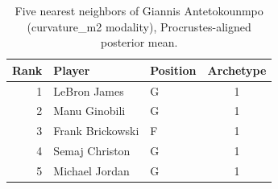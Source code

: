 \begin{table}[htbp]
  \centering\small
  \begin{tabular}{rllc}
    \toprule
    Rank & Player & Position & Archetype \\
    \midrule
    1 & LeBron James & G & 1 \\
    2 & Manu Ginobili & G & 1 \\
    3 & Frank Brickowski & F & 1 \\
    4 & Semaj Christon & G & 1 \\
    5 & Michael Jordan & G & 1 \\
    \bottomrule
  \end{tabular}
  \caption{Five nearest neighbors of Giannis Antetokounmpo (curvature_m2 modality), Procrustes-aligned posterior mean.}
  \label{tab:Giannis_Antetokounmpo_neighbors_curvature_m2}
\end{table}

